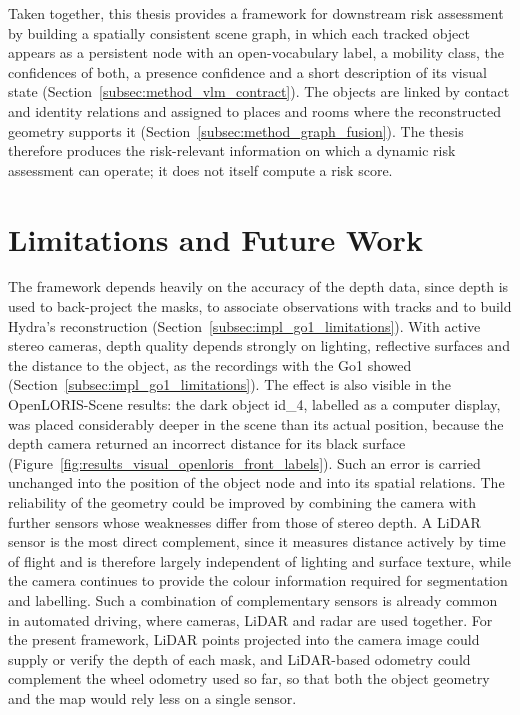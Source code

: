 {\small Taken together, this thesis provides a framework for downstream risk assessment by building a spatially consistent scene graph, in which each tracked object appears as a persistent node with an open-vocabulary label, a mobility class, the confidences of both, a presence confidence and a short description of its visual state (Section~\ref{subsec:method_vlm_contract}). The objects are linked by contact and identity relations and assigned to places and rooms where the reconstructed geometry supports it (Section~\ref{subsec:method_graph_fusion}). The thesis therefore produces the risk-relevant information on which a dynamic risk assessment can operate; it does not itself compute a risk score.\par}


\section{Limitations and Future Work}
\label{sec:limitations}
\label{sec:future_work}

{\small The framework depends heavily on the accuracy of the depth data, since depth is used to back-project the masks, to associate observations with tracks and to build Hydra's reconstruction (Section~\ref{subsec:impl_go1_limitations}). With active stereo cameras, depth quality depends strongly on lighting, reflective surfaces and the distance to the object, as the recordings with the Go1 showed (Section~\ref{subsec:impl_go1_limitations}). The effect is also visible in the OpenLORIS-Scene results: the dark object id\_4, labelled as a computer display, was placed considerably deeper in the scene than its actual position, because the depth camera returned an incorrect distance for its black surface (Figure~\ref{fig:results_visual_openloris_front_labels}). Such an error is carried unchanged into the position of the object node and into its spatial relations. The reliability of the geometry could be improved by combining the camera with further sensors whose weaknesses differ from those of stereo depth. A LiDAR sensor is the most direct complement, since it measures distance actively by time of flight and is therefore largely independent of lighting and surface texture, while the camera continues to provide the colour information required for segmentation and labelling. Such a combination of complementary sensors is already common in automated driving, where cameras, LiDAR and radar are used together. For the present framework, LiDAR points projected into the camera image could supply or verify the depth of each mask, and LiDAR-based odometry could complement the wheel odometry used so far, so that both the object geometry and the map would rely less on a single sensor.\par}

